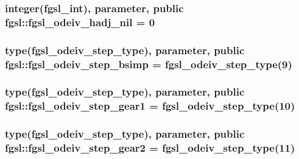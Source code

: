 \hypertarget{classfgsl_ac1c1bce27a4a8cb6ac049b401b496372}{
\subsubsection[{fgsl\-\_\-odeiv\-\_\-hadj\-\_\-nil}]{\setlength{\rightskip}{0pt plus 5cm}integer({\bf fgsl\-\_\-int}), parameter, public fgsl\-::fgsl\-\_\-odeiv\-\_\-hadj\-\_\-nil = 0}}\label{classfgsl_ac1c1bce27a4a8cb6ac049b401b496372}
\hypertarget{classfgsl_a64196b17cea8ee47b1386de3b5c3186e}{
\subsubsection[{fgsl\-\_\-odeiv\-\_\-step\-\_\-bsimp}]{\setlength{\rightskip}{0pt plus 5cm}type({\bf fgsl\-\_\-odeiv\-\_\-step\-\_\-type}), parameter, public fgsl\-::fgsl\-\_\-odeiv\-\_\-step\-\_\-bsimp = {\bf fgsl\-\_\-odeiv\-\_\-step\-\_\-type}(9)}}\label{classfgsl_a64196b17cea8ee47b1386de3b5c3186e}
\hypertarget{classfgsl_adc37c503cd35373720d2238db569e06a}{
\subsubsection[{fgsl\-\_\-odeiv\-\_\-step\-\_\-gear1}]{\setlength{\rightskip}{0pt plus 5cm}type({\bf fgsl\-\_\-odeiv\-\_\-step\-\_\-type}), parameter, public fgsl\-::fgsl\-\_\-odeiv\-\_\-step\-\_\-gear1 = {\bf fgsl\-\_\-odeiv\-\_\-step\-\_\-type}(10)}}\label{classfgsl_adc37c503cd35373720d2238db569e06a}
\hypertarget{classfgsl_ac5f41836ce32fc0099426b20ac83966c}{
\subsubsection[{fgsl\-\_\-odeiv\-\_\-step\-\_\-gear2}]{\setlength{\rightskip}{0pt plus 5cm}type({\bf fgsl\-\_\-odeiv\-\_\-step\-\_\-type}), parameter, public fgsl\-::fgsl\-\_\-odeiv\-\_\-step\-\_\-gear2 = {\bf fgsl\-\_\-odeiv\-\_\-step\-\_\-type}(11)}}\label{classfgsl_ac5f41836ce32fc0099426b20ac83966c}
